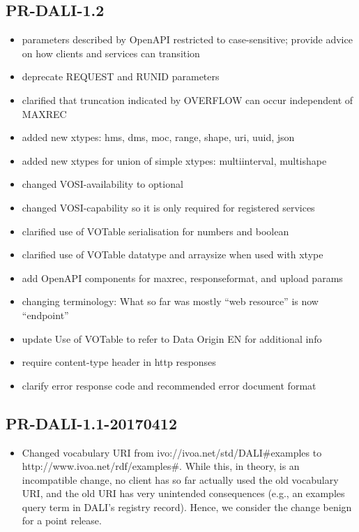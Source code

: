 \documentclass[11pt,letter]{ivoa}
\begin{document}
\subsection{PR-DALI-1.2}
\begin{itemize}
\item parameters described by OpenAPI restricted to case-sensitive; provide
advice on how clients and services can transition 
\item deprecate REQUEST and RUNID parameters
\item clarified that truncation indicated by OVERFLOW can occur independent of
MAXREC
\item added new xtypes: hms, dms, moc, range, shape, uri, uuid, json
\item added new xtypes for union of simple xtypes: multiinterval, multishape
\item changed VOSI-availability to optional
\item changed VOSI-capability so it is only required for registered services
\item clarified use of VOTable serialisation for numbers and boolean
\item clarified use of VOTable datatype and arraysize when used with xtype
\item add OpenAPI components for maxrec, responseformat, and upload params
\item changing terminology: What so far was mostly ``web resource'' is now
``endpoint''
\item update Use of VOTable to refer to Data Origin EN for additional info
\item require content-type header in http responses
\item clarify error response code and recommended error document format
\end{itemize}

\subsection{PR-DALI-1.1-20170412}

\begin{itemize}
\item Changed vocabulary URI from ivo://ivoa.net/std/DALI\#examples to
http://www.ivoa.net/rdf/examples\#.  While this, in theory, is an
incompatible change, no client has so far actually used the old vocabulary
URI, and the old URI has very unintended consequences (e.g., an
examples query term in DALI's registry record).  Hence, we consider the
change benign for a point release.
\end{itemize}
\end{document}

